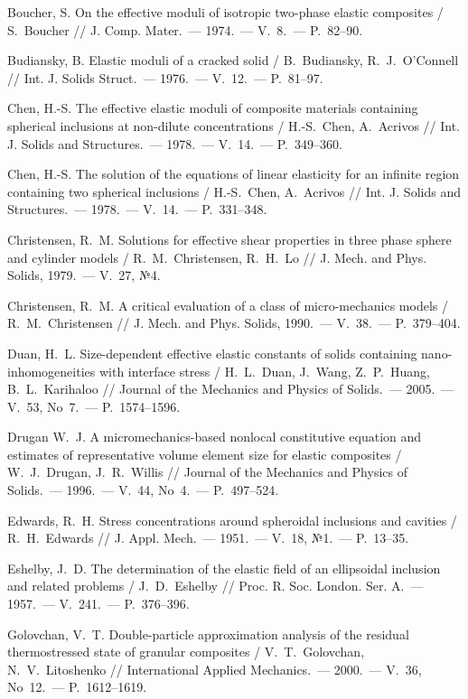 \begin{biblist}{99}
Boucher, S. 
On the effective moduli of isotropic two-phase elastic composites 
/ S.~Boucher 
// J. Comp. Mater.~--- 1974.~--- V.~8.~--- P.~82--90.

Budiansky, B. 
Elastic moduli of a cracked solid 
/ B.~Budiansky, R.~J.~O'Connell 
// Int. J. Solids Struct.~--- 1976.~--- V.~12.~--- P.~81--97.

Chen, H.-S. 
The effective elastic moduli of composite materials containing spherical inclusions at non-dilute concentrations 
/ H.-S.~Chen, A.~Acrivos 
// Int. J. Solids and Structures.~--- 1978.~--- V.~14.~--- P.~349--360.

Chen, H.-S. 
The solution of the equations of linear elasticity for an infinite region containing two spherical inclusions 
/ H.-S.~Chen, A.~Acrivos 
// Int. J. Solids and Structures.~--- 1978.~--- V.~14.~--- P.~331--348.

Christensen, R.~M. 
Solutions for effective shear properties in three phase sphere and cylinder models 
/ R.~M.~Christensen, R.~H.~Lo 
// J. Mech. and Phys. Solids, 1979.~--- V.~27, №4.

Christensen, R.~M. 
A critical evaluation of a class of micro-mechanics models 
/ R.~M.~Christensen 
// J. Mech. and Phys. Solids, 1990.~--- V.~38.~--- P.~379--404.

Duan, H.~L. 
Size-dependent effective elastic constants of solids containing nano-inhomogeneities with interface stress 
/ H.~L.~Duan, J.~Wang, Z.~P.~Huang, B.~L.~Karihaloo 
// Journal of the Mechanics and Physics of Solids.~--- 2005.~--- V.~53, No~7.~--- P.~1574--1596.

Drugan W.~J. 
A micromechanics-based nonlocal constitutive equation and estimates of representative volume element size for elastic composites 
/ W.~J.~Drugan, J.~R.~Willis 
// Journal of the Mechanics and Physics of Solids.~--- 1996.~--- V.~44, No~4.~--- P.~497--524.

Edwards, R.~H. 
Stress concentrations around spheroidal inclusions and cavities 
/ R.~H.~Edwards 
// J. Appl. Mech.~--- 1951.~--- V.~18, №1.~--- P.~13--35.

Eshelby, J.~D. 
The determination of the elastic field of an ellipsoidal inclusion and related problems  
/ J.~D.~Eshelby 
// Proc. R. Soc. London. Ser. A.~--- 1957.~--- V.~241.~--- P.~376--396.

Golovchan, V.~T. 
Double-particle approximation analysis of the residual thermostressed state of granular composites 
/ V.~T.~Golovchan, N.~V.~Litoshenko 
// International Applied Mechanics.~--- 2000.~--- V.~36, No~12.~--- P.~1612--1619.


\end{biblist}
